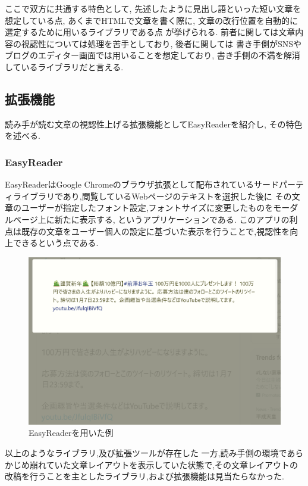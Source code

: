 ここで双方に共通する特色として, 先述したように見出し語といった短い文章を想定している点, 
あくまでHTMLで文章を書く際に, 文章の改行位置を自動的に選定するために用いるライブラリである点
が挙げられる.
前者に関しては文章内容の視認性については処理を苦手としており, 後者に関しては
書き手側がSNSやブログのエディター画面では用いることを想定しており, 
書き手側の不満を解消しているライブラリだと言える.

\subsection{拡張機能}
読み手が読む文章の視認性上げる拡張機能としてEasyReaderを紹介し, その特色を述べる. \footnotemark[4]
\subsubsection{EasyReader}


EasyReaderはGoogle Chromeのブラウザ拡張として配布されているサードパーティライブラリであり,閲覧しているWebページのテキストを選択した後に
その文章のユーザーが指定したフォント設定,フォントサイズに変更したものをモーダルページ上に新たに表示する, というアプリケーションである.
このアプリの利点は既存の文章をユーザー個人の設定に基づいた表示を行うことで,視認性を向上できるという点である.

\begin{figure}[H]
    \centering
    \label{fig:image_5}
    \includegraphics[width=0.6\columnwidth]{image/02/img_5.png}
    \caption[EasyReaderを用いた例]{EasyReaderを用いた例}
\end{figure}

以上のようなライブラリ,及び拡張ツールが存在した
一方,読み手側の環境であらかじめ崩れていた文章レイアウトを表示していた状態で,その文章レイアウトの改稿を行うことを主としたライブラリ,および拡張機能は見当たらなかった.

